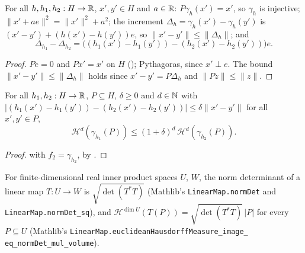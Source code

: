 \begin{lemma}
\label{lem:graph-over}
\leanok
{}
For all $h, h_1, h_2 : H \to \mathbb{R}$, $x', y' \in H$ and $a \in \mathbb{R}$: $P \gamma_h(x') = x'$, so
$\gamma_h$ is injective; $\|x' + a e\|^2 = \|x'\|^2 + a^2$;
the increment $\Delta_h = \gamma_h(x') - \gamma_h(y')$ is $(x' - y') + (h(x') - h(y')) e$, so
$\|x' - y'\| \leq \|\Delta_h\|$; and
\[
  \Delta_{h_1} - \Delta_{h_2} = \bigl((h_1(x') - h_1(y')) - (h_2(x') - h_2(y'))\bigr) e .
\]
\end{lemma}

\begin{proof}
\leanok
$P e = 0$ and $P x' = x'$ on $H$ (); Pythagoras, since $x' \perp e$. The
bound $\|x' - y'\| \leq \|\Delta_h\|$ holds since $x' - y' = P \Delta_h$ and $\|P z\| \leq \|z\|$.
\end{proof}

\begin{lemma}
\label{lem:graph-over-hausdorff}
\leanok
{}
For all $h_1, h_2 : H \to \mathbb{R}$, $P \subseteq H$, $\delta \geq 0$ and $d \in \mathbb{N}$ with
$|(h_1(x') - h_1(y')) - (h_2(x') - h_2(y'))| \leq \delta \|x' - y'\|$ for all $x', y' \in P$,
\[
  \mathcal H^d(\gamma_{h_1}(P)) \leq (1 + \delta)^d \, \mathcal H^d(\gamma_{h_2}(P)).
\]
\end{lemma}

\begin{proof}
\leanok
{} with $f_2 = \gamma_{h_2}$, by .
\end{proof}

For finite-dimensional real inner product spaces $U$, $W$, the norm determinant of a linear map
$T : U \to W$ is $\sqrt{\det(T^* T)}$ (Mathlib's \texttt{LinearMap.\allowbreak normDet} and
\texttt{LinearMap.\allowbreak normDet\_\allowbreak sq}), and
$\mathcal H^{\dim U}(T(P)) = \sqrt{\det(T^* T)} \, |P|$ for every $P \subseteq U$ (Mathlib's
\texttt{LinearMap.\allowbreak euclideanHausdorffMeasure\_\allowbreak image\_\allowbreak
eq\_\allowbreak normDet\_\allowbreak mul\_\allowbreak volume}).


